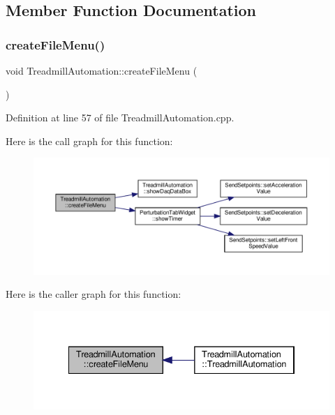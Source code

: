 \subsection{Member Function Documentation}
\mbox{\label{class_treadmill_automation_abd35d06ba9806ec23cfcbb217eece9b2}} 
\subsubsection{\texorpdfstring{create\+File\+Menu()}{createFileMenu()}}
{\footnotesize\ttfamily void Treadmill\+Automation\+::create\+File\+Menu (\begin{DoxyParamCaption}{ }\end{DoxyParamCaption})}



Definition at line 57 of file Treadmill\+Automation.\+cpp.

Here is the call graph for this function\+:
\nopagebreak
\begin{figure}[H]
\begin{center}
\leavevmode
\includegraphics[width=350pt]{class_treadmill_automation_abd35d06ba9806ec23cfcbb217eece9b2_cgraph}
\end{center}
\end{figure}
Here is the caller graph for this function\+:
\nopagebreak
\begin{figure}[H]
\begin{center}
\leavevmode
\includegraphics[width=334pt]{class_treadmill_automation_abd35d06ba9806ec23cfcbb217eece9b2_icgraph}
\end{center}
\end{figure}
\mbox{\label{class_treadmill_automation_aeab5d20e81bca7654bace601c31b836c}} 
